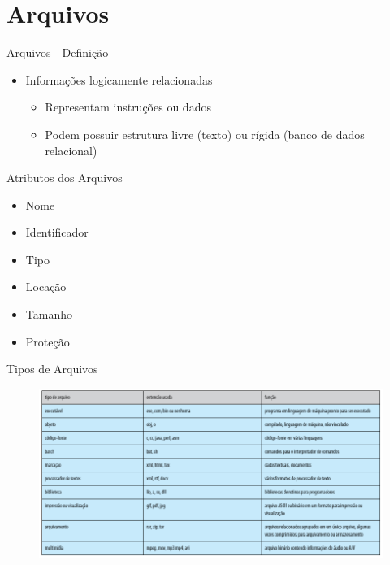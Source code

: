 \documentclass[aspectratio=169,
				xcolor=table]{beamer}
\begin{document}
	\section{Arquivos}
	\begin{frame}{Arquivos - Definição}
		\begin{itemize}
			\item Informações logicamente relacionadas
			\begin{itemize}
				\item Representam instruções ou dados
				\item Podem possuir estrutura livre (texto) ou rígida (banco de dados relacional) 
			\end{itemize}
		\end{itemize}	
	\end{frame}
	
	\begin{frame}{Atributos dos Arquivos}
		\begin{itemize}
			\item Nome
			\vspace{1em}
			\item Identificador
			\vspace{1em}
			\item Tipo
			\vspace{1em}
			\item Locação
			\vspace{1em}
			\item Tamanho
			\vspace{1em}
			\item Proteção
		\end{itemize}
	\end{frame}
	
	\begin{frame}{Tipos de Arquivos}
		
		\begin{figure}[hbtp]
			\centering
			\includegraphics[height=.7\paperheight]{../figs/cap09/tipos.png}
		\end{figure}
			
	\end{frame}
	
\end{document}
